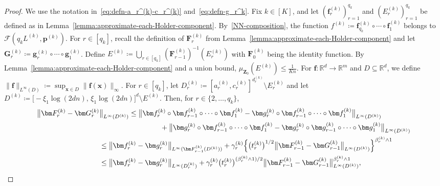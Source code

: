 \documentclass[12pt]{article}
\begin{document}
\begin{proof}
    We use the notation in~\eqref{eq:defn-a_r^(k)-c_r^(k)} and~\eqref{eq:defn-g_r^k}.
    Fix $k \in [K]$, and let $(\bm f^{(k)}_r)_{r=1}^{q_k}$ and $(E^{(k)}_r)_{r=1}^{q_k}$ be defined as in Lemma~\ref{lemma:approximate-each-Holder-component}. By~\ref{NN-composition}, the function $f^{(k)} \coloneqq \bm f^{(k)}_{q_k} \circ\cdots\circ \bm f^{(k)}_1$ belongs to $\mathcal{F}(q_kL^{(k)}, \bm p^{(k)})$. 
    For $r\in[q_k]$, recall the definition of $\bm F^{(k)}_r$ from Lemma~\ref{lemma:approximate-each-Holder-component} and let $\bm G^{(k)}_r \coloneqq \bm g^{(k)}_{r} \circ\cdots\circ \bm g^{(k)}_1$.
    Define $E^{(k)} \coloneqq \bigcup_{r\in[q_k]} (\bm F^{(k)}_{r-1})^{-1}(E^{(k)}_r)$ with $\bm F^{(k)}_0$ being the identity function. By Lemma~\ref{lemma:approximate-each-Holder-component} and a union bound, $\mu_{\bm Z_0}(E^{(k)}) \leq \frac{1}{Kn}$.
    For $\bm f:\mathbb{R}^d \to \mathbb{R}^m$ and $D\subseteq\mathbb{R}^d$, we define $\|\bm f\|_{L^{\infty}(D)} \coloneqq \sup_{\bm x\in D} \|\bm f(\bm x)\|_{\infty}$. For $r\in[q_k]$, let $D^{(k)}_r \coloneqq [a^{(k)}_r, c^{(k)}_r]^{d^{(k)}_r} \setminus E^{(k)}_r$ and let $D^{(k)} \coloneqq \bigl[-\xi_1\log(2dn),\,\xi_1\log(2dn)\bigr]^d \setminus E^{(k)}$. Then, for $r\in\{2,\ldots,q_k\}$,
    \begin{align}
        \bigl\|\bm F^{(k)}_r - \bm G^{(k)}_r&\bigr\|_{L^{\infty}(D^{(k)})} \leq \bigl\|\bm f^{(k)}_r \circ \bm f^{(k)}_{r-1} \circ\cdots\circ \bm f^{(k)}_1 - \bm g^{(k)}_r \circ \bm f^{(k)}_{r-1} \circ\cdots\circ \bm f^{(k)}_1\bigr\|_{L^{\infty}(D^{(k)})} \nonumber\\
        &\hspace{3cm} + \bigl\|\bm g^{(k)}_r \circ \bm f^{(k)}_{r-1} \circ\cdots\circ \bm f^{(k)}_1 - \bm g^{(k)}_r \circ \bm g^{(k)}_{r-1} \circ\cdots\circ \bm g^{(k)}_1\bigr\|_{L^{\infty}(D^{(k)})} \nonumber\\
        &\leq \bigl\|\bm f^{(k)}_r - \bm g^{(k)}_r\bigr\|_{L^{\infty} (\bm F^{(k)}_{r-1}(D^{(k)}))} + \gamma^{(k)}_r \Bigl\{ \bigl(t^{(k)}_r\bigr)^{1/2}\bigl\|\bm F^{(k)}_{r-1} - \bm G^{(k)}_{r-1}\bigr\|_{L^{\infty}(D^{(k)})} \Bigr\}^{\beta^{(k)}_r \wedge 1} \nonumber\\
        &\leq \bigl\|\bm f^{(k)}_r - \bm g^{(k)}_r\bigr\|_{L^{\infty} (D^{(k)}_r)} + \gamma^{(k)}_r \bigl(t^{(k)}_r\bigr)^{(\beta^{(k)}_r \wedge 1)/2} \bigl\|\bm F^{(k)}_{r-1} - \bm G^{(k)}_{r-1}\bigr\|_{L^{\infty}(D^{(k)})}^{\beta^{(k)}_r \wedge 1}, \label{eq:composition-error}

\end{align}
\end{proof}
\end{document}
